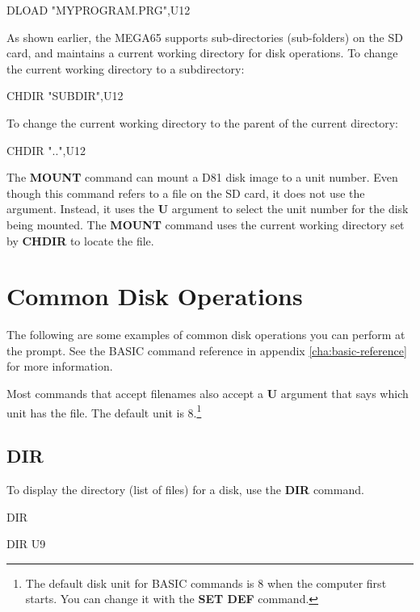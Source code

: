 \begin{screenoutput}
DLOAD "MYPROGRAM.PRG",U12
\end{screenoutput}

As shown earlier, the MEGA65 supports sub-directories (sub-folders) on the SD card, and maintains a current working directory for disk operations. To change the current working directory to a subdirectory:

\begin{screenoutput}
CHDIR "SUBDIR",U12
\end{screenoutput}

To change the current working directory to the parent of the current directory:

\begin{screenoutput}
CHDIR "..",U12
\end{screenoutput}

The {\bf MOUNT} command can mount a D81 disk image to a unit number. Even though this command refers to a file on the SD card, it does not use the  argument. Instead, it uses the {\bf U} argument to select the unit number for the disk being mounted. The {\bf MOUNT} command uses the current working directory set by {\bf CHDIR} to locate the file.


\section{Common Disk Operations}

The following are some examples of common disk operations you can perform at the  prompt. See the BASIC command reference in appendix \vref{cha:basic-reference} for more information.

Most commands that accept filenames also accept a {\bf U} argument that says which unit has the file. The default unit is 8.\footnote{The default disk unit for BASIC commands is 8 when the computer first starts. You can change it with the {\bf SET DEF} command.}

\subsection{DIR}

To display the directory (list of files) for a disk, use the {\bf DIR} command.

\begin{screenoutput}
DIR

DIR U9
\end{screenoutput}


